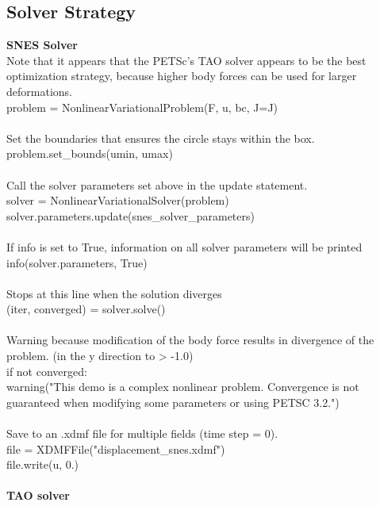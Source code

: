 \documentclass[12pt,3p]{article}
\begin{document}
\subsection{Solver Strategy}
\textbf{SNES Solver} \\
Note that it appears that the PETSc's TAO solver appears to be the best optimization strategy, because higher body forces can be used for larger deformations. \\
{\selectfont
problem = NonlinearVariationalProblem(F, u, bc, J=J) \\ \\
} 
Set the boundaries that ensures the circle stays within the box. \\
{\selectfont
problem.set\_bounds(umin, umax) \\ \\
}
Call the solver parameters set above in the update statement. \\
{\selectfont
solver = NonlinearVariationalSolver(problem) \\
solver.parameters.update(snes\_solver\_parameters) \\ \\
}
If {\selectfont info} is set to True, information on all solver parameters will be printed \\
{\selectfont
info(solver.parameters, True) \\ \\
}
Stops at this line when the solution diverges \\ 
{\selectfont
(iter, converged) = solver.solve() \\ \\ 
}
Warning because modification of the body force results in divergence of the problem. (in the y direction to > -1.0)  \\
{\selectfont
if not converged: \\
\indent warning("This demo is a complex nonlinear problem. Convergence is not guaranteed when modifying some parameters or using PETSC 3.2.") \\ \\
} 
Save to an .xdmf file for multiple fields (time step = 0). \\
{\selectfont
file = XDMFFile("displacement\_snes.xdmf") \\
file.write(u, 0.) \\ \\
}
\textbf{TAO solver} \\
\end{document}
